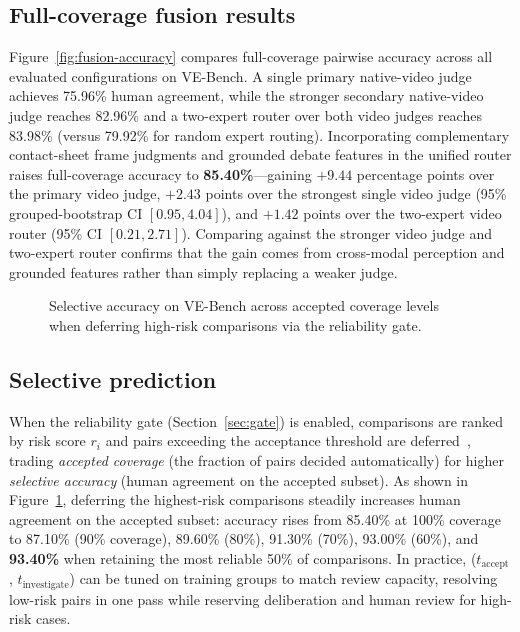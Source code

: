 \subsection{Full-coverage fusion results}
Figure~\ref{fig:fusion-accuracy} compares full-coverage pairwise accuracy across all evaluated configurations on VE-Bench. A single primary native-video judge achieves 75.96\% human agreement, while the stronger secondary native-video judge reaches 82.96\% and a two-expert router over both video judges reaches 83.98\% (versus 79.92\% for random expert routing). Incorporating complementary contact-sheet frame judgments and grounded debate features in the unified \critical router raises full-coverage accuracy to \textbf{85.40\%}---gaining $+9.44$ percentage points over the primary video judge, $+2.43$ points over the strongest single video judge (95\% grouped-bootstrap CI $[0.95, 4.04]$), and $+1.42$ points over the two-expert video router (95\% CI $[0.21, 2.71]$). Comparing against the stronger video judge and two-expert router confirms that the gain comes from cross-modal perception and grounded features rather than simply replacing a weaker judge.

\begin{figure}[t]
\centering

\caption{Selective accuracy on VE-Bench across accepted coverage levels when deferring high-risk comparisons via the reliability gate.}
\label{fig:selective-routing}
\end{figure}

\subsection{Selective prediction}
When the reliability gate (Section~\ref{sec:gate}) is enabled, comparisons are ranked by risk score $r_i$ and pairs exceeding the acceptance threshold are deferred~\cite{geifman2017selective,madras2018predict}, trading \emph{accepted coverage} (the fraction of pairs decided automatically) for higher \emph{selective accuracy} (human agreement on the accepted subset). As shown in Figure~\ref{fig:selective-routing}, deferring the highest-risk comparisons steadily increases human agreement on the accepted subset: accuracy rises from 85.40\% at 100\% coverage to 87.10\% (90\% coverage), 89.60\% (80\%), 91.30\% (70\%), 93.00\% (60\%), and \textbf{93.40\%} when retaining the most reliable 50\% of comparisons. In practice, ($t_{\mathrm{accept}}$, $t_{\mathrm{investigate}}$) can be tuned on training groups to match review capacity, resolving low-risk pairs in one pass while reserving deliberation and human review for high-risk cases.

